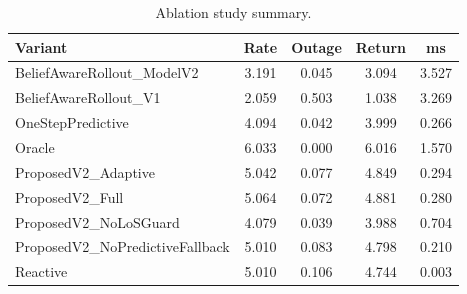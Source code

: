 \begin{table}[t]
\centering
\scriptsize
\setlength{\tabcolsep}{3pt}
\caption{Ablation study summary.}
\label{tab:ablation}
\begin{tabular}{lcccc}
\toprule
Variant & Rate & Outage & Return & ms \\
\midrule
BeliefAwareRollout\_ModelV2 & 3.191 & 0.045 & 3.094 & 3.527 \\
BeliefAwareRollout\_V1 & 2.059 & 0.503 & 1.038 & 3.269 \\
OneStepPredictive & 4.094 & 0.042 & 3.999 & 0.266 \\
Oracle & 6.033 & 0.000 & 6.016 & 1.570 \\
ProposedV2\_Adaptive & 5.042 & 0.077 & 4.849 & 0.294 \\
ProposedV2\_Full & 5.064 & 0.072 & 4.881 & 0.280 \\
ProposedV2\_NoLoSGuard & 4.079 & 0.039 & 3.988 & 0.704 \\
ProposedV2\_NoPredictiveFallback & 5.010 & 0.083 & 4.798 & 0.210 \\
Reactive & 5.010 & 0.106 & 4.744 & 0.003 \\
\bottomrule
\end{tabular}
\end{table}
